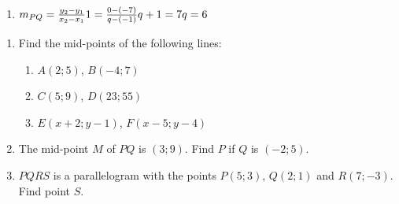 \begin{solutions}{}
{\begin{enumerate}[itemsep=5pt, label=\textbf{\arabic*}. ]
\item $m_{PQ} = \frac{y_2-y_1}{x_2-x_1}\\
  1 = \frac{0-(-7)}{q-(-1)}\\
  q+1 = 7\\
  q = 6\\$
\end{enumerate}}
\end{solutions}

\begin{exercises}{}{
\begin{enumerate}[itemsep=5pt, label=\textbf{\arabic*}. ]
\item Find the mid-points of the following lines:
  \begin{enumerate}[noitemsep, label=\textbf{(\alph*)} ]
\item $A(2;5)$, $B(-4;7)$
\item $C(5;9)$, $D(23;55)$
\item $E(x+2;y-1)$, $F(x-5;y-4)$
\end{enumerate}

    \item The mid-point $M$ of $PQ$ is $(3;9)$. Find $P$ if $Q$ is $(-2;5)$.
    \item $PQRS$ is a parallelogram with the points $P(5;3)$, $Q(2;1)$ and $R(7;-3)$. Find point $S$.
    \end{enumerate}
}
\end{exercises}    

